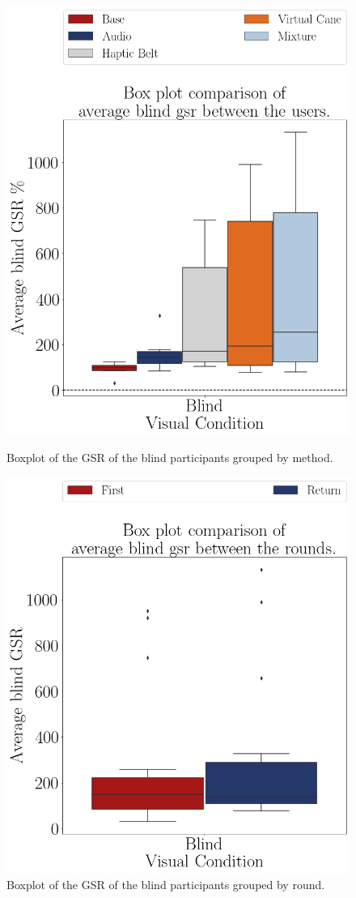 \begin{figure}[!htb]
    \centering
    \begin{minipage}{0.45\textwidth}
        \centering
        \includegraphics[width = 0.8\linewidth]{Resultados/GSR/Figuras/png/boxplot_gsr_avg_blind_scene.png}
        \caption{Boxplot of the GSR of the blind participants grouped by method.}
        \label{fig:boxplot_gsr_avg_blind_scene}
    \end{minipage}
    \begin{minipage}{0.45\textwidth}
        \centering
        \includegraphics[width = 0.8\linewidth]{Resultados/GSR/Figuras/png/boxplot_gsr_avg_blind_rounds.png}
        \caption{Boxplot of the GSR of the blind participants grouped by round.}
        \label{fig:boxplot_gsr_avg_blind_rounds}
    \end{minipage}
\end{figure}

